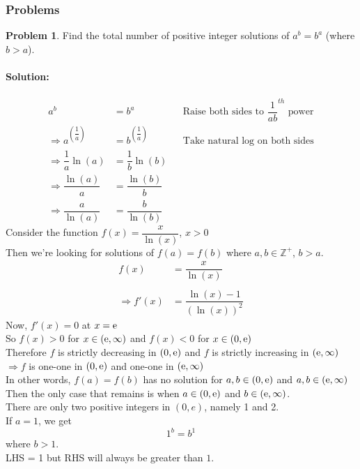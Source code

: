 \documentclass[14]{article}
\theoremstyle{definition}
\newtheorem{prob}{Problem}
\theoremstyle{case}
\begin{document}
\subsubsection{Problems}
\begin{prob}
Find the total number of positive integer solutions of $a^b = b^a$ (where $b>a$).
\end{prob}
\paragraph{Solution:}
\begin{align*}
a^b &= b^a && \text{Raise both sides to } \dfrac1{ab}^{th}\text{ power}\\
\Rightarrow a^{\left(\dfrac{1}{a}\right)} &= b^{\left(\dfrac{1}{a}\right)} && \text{Take natural log  on both sides}\\
\Rightarrow \dfrac{1}{a} \ln(a) &= \dfrac{1}{b} \ln(b)\\
\Rightarrow \dfrac{\ln(a)}{a} &= \dfrac{\ln(b)}{b}\\
\Rightarrow \dfrac{a}{\ln(a)} &= \dfrac{b}{\ln(b)}
\end{align*}
Consider the function $f(x) = \dfrac{x}{\ln(x)}$, $x > 0$\\
Then we're looking for solutions of $f(a) = f(b)$ where $a, b \in \mathbb{Z}^+$, $b > a$.
\begin{align*}
f(x) &= \dfrac{x}{\ln(x)}\\\\
\Rightarrow f'(x) &= \dfrac{\ln(x) - 1}{(\ln(x))^2}
\end{align*}
Now, $f'(x) = 0$ at $x = {\rm e}$\\
So $f(x) > 0$ for $x \in ( {\rm e}, \infty)$ and $f(x) < 0$ for $x \in (0, {\rm e})$\\
Therefore $f$ is strictly decreasing in $(0, {\rm e})$ and $f$ is strictly increasing in $({\rm e}, \infty)$\\
$\Rightarrow f$ is one-one in $(0, {\rm e})$ and one-one in $({\rm e}, \infty)$\\
In other words, $f(a) = f(b)$ has no solution for $a, b \in (0, {\rm e})$ and $a, b \in ({\rm e}, \infty)$\\
Then the only case that remains is when $a \in (0, {\rm e})$ and $b \in ({\rm e}, \infty)$.\\
There are only two positive integers in $(0, e)$, namely 1 and 2.\\
If $a = 1$, we get
\[1^b = b ^1\]
where $b > 1$.\\
LHS = 1 but RHS will always be greater than $1$.\\
\end{document}
